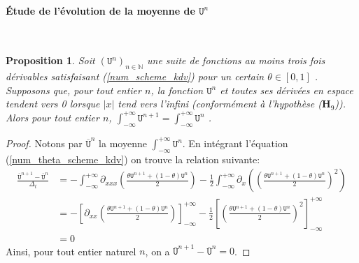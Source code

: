 \documentclass[12pt,a4paper]{article}
\newtheorem{prop}[dfn]{\textbf{Proposition}}
\numberwithin{equation}{section}
\begin{document}
\paragraph{Étude de l'évolution de la moyenne de $\texttt{U}^n$}\,\\
\begin{prop}
    Soit $(\texttt{U}^n)_{n  \in \mathbb{N}}$ une suite de fonctions au moins trois fois dérivables satisfaisant (\ref{num_scheme_kdv}) pour un certain $\theta\in[0,1]$ . Supposons que, pour tout entier $n$, la fonction $\texttt{U}^n$ et toutes ses dérivées en espace tendent vers 0 lorsque $|x|$ tend vers l'infini (conformément à l'hypothèse ($\textbf{H}_9$)). Alors pour tout entier $n$, $\int_{-\infty}^{+\infty}\texttt{U}^{n+1} = \int_{-\infty}^{+\infty}\texttt{U}^n$ .
\end{prop}
\begin{proof}
    Notons par $\overline{\texttt{U}}^n$ la moyenne $\int_{-\infty}^{+\infty}\texttt{U}^n$. En intégrant l'équation (\ref{num_theta_scheme_kdv}) on trouve la relation suivante:
\begin{equation*}
\begin{split}
    \frac{\overline{\texttt{U}}^{n+1}-\overline{\texttt{U}}^n}{\Delta_t} 
    &= -\int_{-\infty}^{+\infty} \partial_{xxx}\left(\frac{\theta\texttt{U}^{n+1} + (1-\theta)\texttt{U}^{n}}{2}\right) -\frac{1}{2}\int_{-\infty}^{+\infty} \partial_{x}\left( \left(\frac{\theta\texttt{U}^{n+1} + (1-\theta)\texttt{U}^{n}}{2}\right)^2 \right) \\
    &= - \left[ \partial_{xx}\left(\frac{\theta\texttt{U}^{n+1} + (1-\theta)\texttt{U}^{n}}{2}\right)\right]_{-\infty}^{+\infty} -\frac{1}{2}\left[\left(\frac{\theta\texttt{U}^{n+1} + (1-\theta)\texttt{U}^{n}}{2}\right)^2 \right]_{-\infty}^{+\infty} \\
    & = 0
\end{split}
\end{equation*}
Ainsi, pour tout entier naturel $n$, on a $\overline{\texttt{U}}^{n+1} - \overline{\texttt{U}}^{n} = 0$.
\end{proof}
\end{document}
